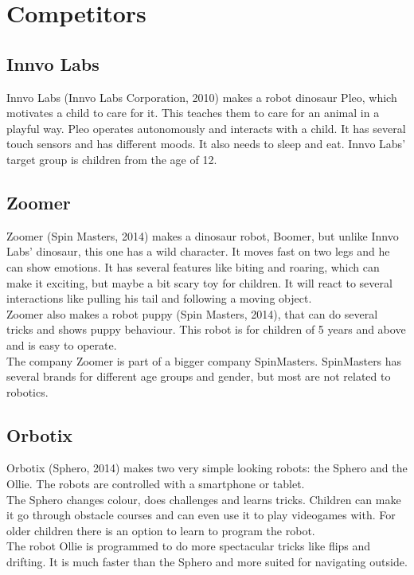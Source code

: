 \documentclass[11pt,twoside,a4paper]{report}
\begin{document}
\begin{appendices}
\label{appendix:software}

\chapter{Competitors}
\label{appendix:competitors}
\section{Innvo Labs}
Innvo Labs (Innvo Labs Corporation, 2010) makes a robot dinosaur Pleo, which motivates a child to care for it. This teaches them to care for an animal in a playful way. Pleo operates autonomously and interacts with a child. It has several touch sensors and has different moods. It also needs to sleep and eat. Innvo Labs\rq{} target group is children from the age of 12.
\section{Zoomer}
Zoomer (Spin Masters, 2014) makes a dinosaur robot, Boomer, but unlike Innvo Labs\rq{} dinosaur, this one has a wild character. It moves fast on two legs and he can show emotions. It has several features like biting and roaring, which can make it exciting, but maybe a bit scary toy for children. It will react to several interactions like pulling his tail and following a moving object. \\
Zoomer also makes a robot puppy (Spin Masters, 2014), that can do several tricks and shows puppy behaviour. This robot is for children of 5 years and above and is easy to operate. \\
The company Zoomer is part of a bigger company SpinMasters. SpinMasters has several brands for different age groups and gender, but most are not related to robotics.
\section{Orbotix}
Orbotix (Sphero, 2014) makes two very simple looking robots: the Sphero and the Ollie. The robots are controlled with a smartphone or tablet. \\
The Sphero changes colour, does challenges and learns tricks. Children can make it go through obstacle courses and can even use it to play videogames with. For older children there is an option to learn to program the robot. \\
The robot Ollie is programmed to do more spectacular tricks like flips and drifting. It is much faster than the Sphero and more suited for navigating outside.

\end{appendices}
\end{document}
